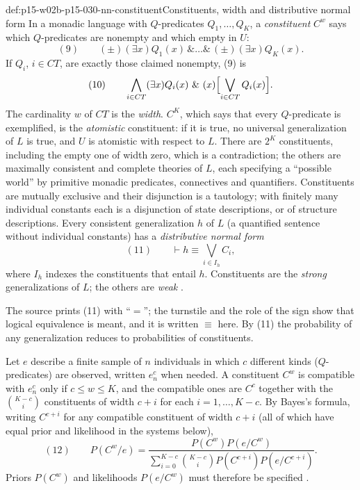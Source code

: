 \begin{hbdefinition}{def:p15-w02b-p15-030-nn-constituent}{Constituents, width and distributive normal form}
In a monadic language with \(Q\)-predicates \(Q_1,\ldots,Q_K\), a
\emph{constituent} \(C^w\) says which \(Q\)-predicates are nonempty and
which empty in \(U\):
\[
 (9)\qquad (\pm)(\exists x)Q_1(x)\,\&\ldots\&\,(\pm)(\exists x)Q_K(x).
\]
If \(Q_i\), \(i\in CT\), are exactly those claimed nonempty, (9) is
\[
 (10)\qquad \bigwedge_{i\in CT}(\exists x)Q_i(x)\ \&\ (x)\Bigl[\bigvee_{i\in CT}Q_i(x)\Bigr].
\]
The cardinality \(w\) of \(CT\) is the \emph{width}. \(C^K\), which says
that every \(Q\)-predicate is exemplified, is the \emph{atomistic}
constituent: if it is true, no universal generalization of \(L\) is
true, and \(U\) is atomistic with respect to \(L\). There are \(2^K\)
constituents, including the empty one of width zero, which is a
contradiction; the others are maximally consistent and complete theories
of \(L\), each specifying a ``possible world'' by primitive monadic
predicates, connectives and quantifiers. Constituents are mutually
exclusive and their disjunction is a tautology; with finitely many
individual constants each is a disjunction of state descriptions, or of
structure descriptions. Every consistent generalization \(h\) of \(L\) (a
quantified sentence without individual constants) has a
\emph{distributive normal form}
\[
 (11)\qquad \vdash h\equiv\bigvee_{i\in I_h}C_i,
\]
where \(I_h\) indexes the constituents that entail \(h\). Constituents are
the \emph{strong} generalizations of \(L\); the others are \emph{weak}
\cite[pp.~318--319]{Niiniluoto2011HintikkaProgramReading}.
\end{hbdefinition}

The source prints (11) with ``\(=\)''; the turnstile and the role of the
sign show that logical equivalence is meant, and it is written
\(\equiv\) here. By (11) the probability of any generalization reduces
to probabilities of constituents.

Let \(e\) describe a finite sample of \(n\) individuals in which \(c\)
different kinds (\(Q\)-predicates) are observed, written \(e^c_n\) when
needed. A constituent \(C^w\) is compatible with \(e^c_n\) only if
\(c\leq w\leq K\), and the compatible ones are \(C^c\) together with the
\(\binom{K-c}{i}\) constituents of width \(c+i\) for each
\(i=1,\ldots,K-c\). By Bayes's formula, writing \(C^{c+i}\) for any
compatible constituent of width \(c+i\) (all of which have equal prior
and likelihood in the systems below),
\[
 (12)\qquad P(C^w/e)=\frac{P(C^w)P(e/C^w)}
   {\sum_{i=0}^{K-c}\binom{K-c}{i}P(C^{c+i})P(e/C^{c+i})}.
\]
Priors \(P(C^w)\) and likelihoods \(P(e/C^w)\) must therefore be
specified \cite[p.~319]{Niiniluoto2011HintikkaProgramReading}.

